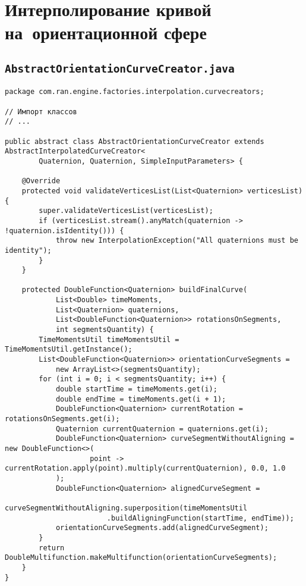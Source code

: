 \chapter{Интерполирование кривой на~ориентационной сфере}

\section*{\texttt{AbstractOrientationCurveCreator.java}}
\begin{verbatim}
package com.ran.engine.factories.interpolation.curvecreators;

// Импорт классов
// ...

public abstract class AbstractOrientationCurveCreator extends AbstractInterpolatedCurveCreator<
        Quaternion, Quaternion, SimpleInputParameters> {

    @Override
    protected void validateVerticesList(List<Quaternion> verticesList) {
        super.validateVerticesList(verticesList);
        if (verticesList.stream().anyMatch(quaternion -> !quaternion.isIdentity())) {
            throw new InterpolationException("All quaternions must be identity");
        }
    }

    protected DoubleFunction<Quaternion> buildFinalCurve(
            List<Double> timeMoments,
            List<Quaternion> quaternions,
            List<DoubleFunction<Quaternion>> rotationsOnSegments,
            int segmentsQuantity) {
        TimeMomentsUtil timeMomentsUtil = TimeMomentsUtil.getInstance();
        List<DoubleFunction<Quaternion>> orientationCurveSegments =
            new ArrayList<>(segmentsQuantity);
        for (int i = 0; i < segmentsQuantity; i++) {
            double startTime = timeMoments.get(i);
            double endTime = timeMoments.get(i + 1);
            DoubleFunction<Quaternion> currentRotation = rotationsOnSegments.get(i);
            Quaternion currentQuaternion = quaternions.get(i);
            DoubleFunction<Quaternion> curveSegmentWithoutAligning = new DoubleFunction<>(
                    point -> currentRotation.apply(point).multiply(currentQuaternion), 0.0, 1.0
            );
            DoubleFunction<Quaternion> alignedCurveSegment =
                    curveSegmentWithoutAligning.superposition(timeMomentsUtil
                        .buildAligningFunction(startTime, endTime));
            orientationCurveSegments.add(alignedCurveSegment);
        }
        return DoubleMultifunction.makeMultifunction(orientationCurveSegments);
    }
}
\end{verbatim}

